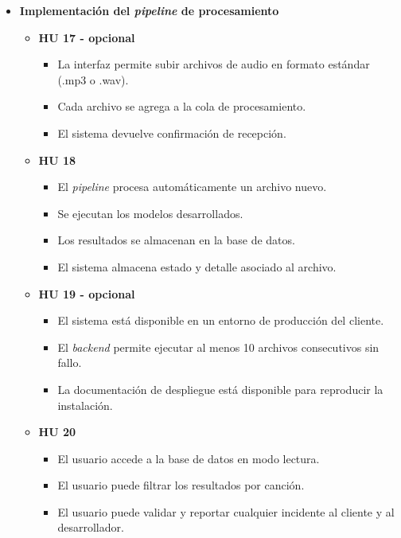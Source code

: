 \documentclass[
11pt, %
]{charter}
\begin{document}
\begin{itemize}
  \item \textbf{Implementación del  \textit{pipeline} de procesamiento}
    \begin{itemize}
      \item \textbf{HU 17 - opcional}
      \begin{itemize}
        \item La interfaz permite subir archivos de audio en formato estándar (.mp3 o .wav).
        \item Cada archivo se agrega a la cola de procesamiento.
        \item El sistema devuelve confirmación de recepción.
        \vspace{2cm}
      \end{itemize}
      \item \textbf{HU 18}
        \begin{itemize}
        \item El \textit{pipeline} procesa automáticamente un archivo nuevo.
        \item Se ejecutan los modelos desarrollados.
        \item Los resultados se almacenan en la base de datos.
        \item El sistema almacena estado y detalle asociado al archivo.
        \end{itemize}
      \item \textbf{HU 19 - opcional}
      \begin{itemize}
        \item El sistema está disponible en un entorno de producción del cliente.
        \item El \textit{backend} permite ejecutar al menos 10 archivos consecutivos sin fallo.
        \item La documentación de despliegue está disponible para reproducir la instalación.
      \end{itemize}
      \item \textbf{HU 20}
      \begin{itemize}
        \item El usuario accede a la base de datos en modo lectura.
        \item El usuario puede filtrar los resultados por canción.
        \item El usuario puede validar y reportar cualquier incidente al cliente y al desarrollador.
      \end{itemize}
    \end{itemize}

\end{itemize}
\end{document}

